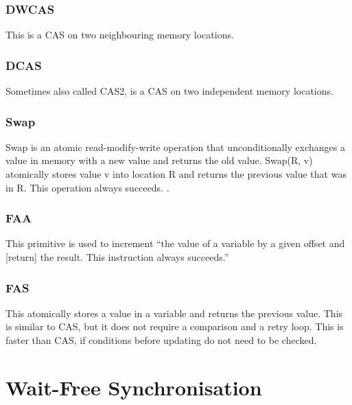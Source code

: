 \subsubsection{\ac{DWCAS}}\label{subsubsec:double-compare-and-swap}
This is a \ac{CAS} on two neighbouring memory locations. \cite{Fuchs2014EvaluationOT}

\subsubsection{\ac{DCAS}}\label{subsubsec:double-with-compare-and-swap}
Sometimes also called \ac{CAS}2, is a \ac{CAS} on two independent memory locations. \cite{Fuchs2014EvaluationOT}

\subsubsection{Swap}\label{subsubsec:swap}
Swap is an atomic read-modify-write operation that unconditionally exchanges a value in memory with a new value and returns the old value. Swap(R, v) atomically stores value v into location R and returns the previous value that was in R. This operation always succeeds. \cite{Mateíspmc}.

\subsubsection{\acf{FAA}}\label{subsubsec:fetch-and-add}
This primitive is used to increment \enquote{the value of a variable by a given offset and [return] the result. This instruction always succeeds.} \cite{Fuchs2014EvaluationOT}

\subsubsection{\ac{FAS}}\label{subsubsec:fetch-and-store}
This atomically stores a value in a variable and returns the previous value. This is similar to \ac{CAS}, but it does not require a comparison and a retry loop. This is faster than \ac{CAS}, if conditions before updating do not need to be checked. \cite{Drescher2015GuardedSections}

\section{Wait-Free Synchronisation}\label{sec:wait-free}

